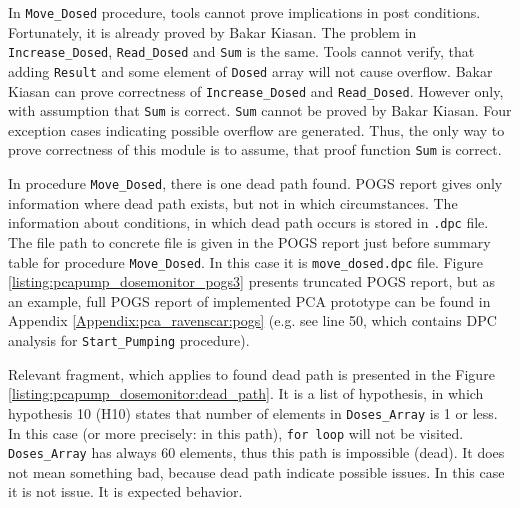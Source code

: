 In \lstinline{Move_Dosed} procedure, tools cannot prove implications in post conditions. Fortunately, it is already proved by Bakar Kiasan. The problem in \lstinline{Increase_Dosed}, \lstinline{Read_Dosed} and \lstinline{Sum} is the same. Tools cannot verify, that adding \lstinline{Result} and some element of \lstinline{Dosed} array will not cause overflow. Bakar Kiasan can prove correctness of \lstinline{Increase_Dosed} and \lstinline{Read_Dosed}. However only, with assumption that \lstinline{Sum} is correct. \lstinline{Sum} cannot be proved by Bakar Kiasan. Four exception cases indicating possible overflow are generated. Thus, the only way to prove correctness of this module is to assume, that proof function \lstinline{Sum} is correct.

In procedure \lstinline{Move_Dosed}, there is one dead path found. POGS report gives only information where dead path exists, but not in which circumstances. The information about conditions, in which dead path occurs is stored in \lstinline{.dpc} file. The file path to concrete file is given in the POGS report just before summary table for procedure \lstinline{Move_Dosed}. In this case it is \lstinline{move_dosed.dpc} file. Figure \ref{listing:pcapump_dosemonitor_pogs3} presents truncated POGS report, but as an example, full POGS report of implemented PCA prototype can be found in Appendix \ref{Appendix:pca_ravenscar:pogs} (e.g. see line 50, which contains DPC analysis for \lstinline{Start_Pumping} procedure). 

Relevant fragment, which applies to found dead path is presented in the Figure \ref{listing:pcapump_dosemonitor:dead_path}. It is a list of hypothesis, in which hypothesis 10 (H10) states that number of elements in \lstinline{Doses_Array} is 1 or less. In this case (or more precisely: in this path), \lstinline{for loop} will not be visited. \lstinline{Doses_Array} has always 60 elements, thus this path is impossible (dead). It does not mean something bad, because dead path indicate possible issues. In this case it is not issue. It is expected behavior.

